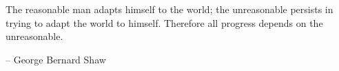 The reasonable man adapts himself to the world;
the unreasonable persists in trying to adapt the world to himself.
Therefore all progress depends on the unreasonable.

-- George Bernard Shaw
